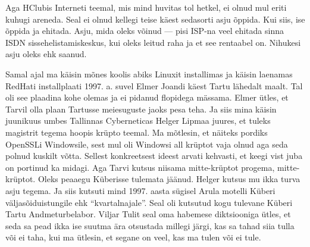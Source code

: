 Aga HClubis Interneti teemal, mis mind huvitas tol hetkel, ei olnud mul eriti
kuhugi areneda. Seal ei olnud kellegi teise käest sedasorti asju õppida. Kui
siis, ise õppida ja ehitada. Asju, mida oleks võinud --- pisi ISP-na veel
ehitada sinna ISDN sissehelistamiskeskus, kui oleks leitud raha ja et see
rentaabel on. Nihukesi asju oleks ehk saanud.

Samal ajal ma käisin mõnes koolis abiks Linuxit installimas ja käisin laenamas
RedHati installplaati 1997. a. suvel Elmer Joandi
käest Tartu lähedalt maalt. Tal oli see plaadina kohe olemas ja ei pidanud
flopidega mässama. Elmer ütles, et Tarvil olla plaan
Tartusse meiesuguste jaoks pesa teha. Ja siis mina käisin juunikuus umbes
Tallinnas Cyberneticas Helger Lipmaa  juures, et tuleks magistrit tegema hoopis krüpto teemal. Ma mõtlesin,
et näiteks pordiks OpenSSLi Windowsile, sest
mul oli Windowsi all krüptot vaja olnud aga seda polnud kuskilt võtta. Sellest
konkreetsest ideest arvati kehvasti, et keegi vist juba on portinud ka midagi.
Aga Tarvi kutsus niisama mitte-krüptot progema, mitte-krüptot. Oleks peaaegu
Küberisse tulemata jäänud. Helger kutsus mu ikka turva asju tegema. Ja siis
kutsuti mind 1997. aasta sügisel Arula motelli Küberi väljasõiduistungile ehk \enquote{kvartalnajale}. Seal oli kutsutud kogu tulevane
Küberi Tartu Andmeturbelabor. Viljar
Tulit seal oma habemese diktsiooniga ütles, et seda
sa pead ikka ise suutma ära otsustada millegi järgi, kas sa tahad siia tulla
või ei taha, kui ma ütlesin, et segane on veel, kas ma tulen või ei tule.

